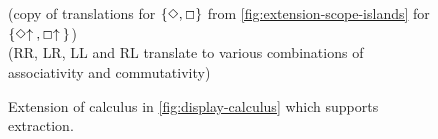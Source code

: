 \begin{figure}[hb]
\begin{mdframed}
    \vspace*{\baselineskip}%
    \begin{pfbox}
    \end{pfbox}
    \begin{pfbox}
    \end{pfbox}
    \\
    \vspace*{\baselineskip}
    \hrulefill
    \\
    \vspace*{\baselineskip}
    (copy of translations for $\{\Diamond,\Box\}$ from
    \autoref{fig:extension-scope-islands} for $\{\Diamond{\uparrow}\:,\Box{\uparrow}\:\}$)
    \\
    \vspace*{\baselineskip}
    ({RR\diUp}, {LR\diUp}, {LL\diUp} and {RL\diUp} translate to
    various combinations of associativity and commutativity)
    \\
    \vspace*{\baselineskip}
  \end{mdframed}
  \caption{Extension of calculus in \autoref{fig:display-calculus}
    which supports extraction.}
  \label{fig:extension-extraction}
\end{figure}
%
